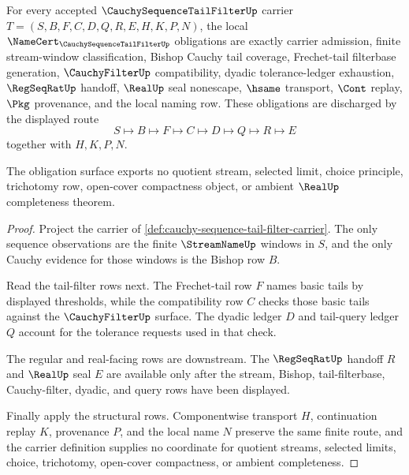 
\begin{theorem}
\label{thm:cauchy-sequence-tail-filter-namecert-obligations}
For every accepted $\CauchySequenceTailFilterUp$ carrier $T=(S,B,F,C,D,Q,R,E,H,K,P,N)$, the local $\NameCert_{\CauchySequenceTailFilterUp}$ obligations are exactly carrier admission, finite stream-window classification, Bishop Cauchy tail coverage, Frechet-tail filterbase generation, $\CauchyFilterUp$ compatibility, dyadic tolerance-ledger exhaustion, $\RegSeqRatUp$ handoff, $\RealUp$ seal nonescape, $\hsame$ transport, $\Cont$ replay, $\Pkg$ provenance, and the local naming row. These obligations are discharged by the displayed route
$$
S \longmapsto B \longmapsto F \longmapsto C \longmapsto D \longmapsto Q \longmapsto R \longmapsto E
$$
together with $H,K,P,N$.

The obligation surface exports no quotient stream, selected limit, choice principle, trichotomy row, open-cover compactness object, or ambient $\RealUp$ completeness theorem.
\end{theorem}
\begin{proof}
Project the carrier of \autoref{def:cauchy-sequence-tail-filter-carrier}. The only sequence observations are the finite $\StreamNameUp$ windows in $S$, and the only Cauchy evidence for those windows is the Bishop row $B$.

Read the tail-filter rows next. The Frechet-tail row $F$ names basic tails by displayed thresholds, while the compatibility row $C$ checks those basic tails against the $\CauchyFilterUp$ surface. The dyadic ledger $D$ and tail-query ledger $Q$ account for the tolerance requests used in that check.

The regular and real-facing rows are downstream. The $\RegSeqRatUp$ handoff $R$ and $\RealUp$ seal $E$ are available only after the stream, Bishop, tail-filterbase, Cauchy-filter, dyadic, and query rows have been displayed.

Finally apply the structural rows. Componentwise transport $H$, continuation replay $K$, provenance $P$, and the local name $N$ preserve the same finite route, and the carrier definition supplies no coordinate for quotient streams, selected limits, choice, trichotomy, open-cover compactness, or ambient completeness.
\end{proof}

